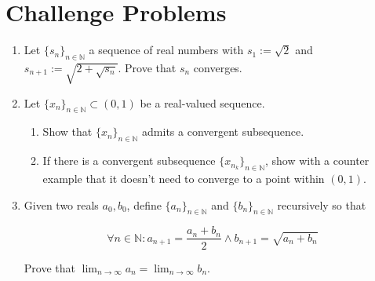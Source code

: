 \documentclass{article}
\theoremstyle{definition}
\begin{document}
\newpage

\section{Challenge Problems}

\begin{enumerate}
    \item Let $\{s_{n}\}_{n \in \mathbb{N}}$ a sequence of real numbers with $s_{1} := \sqrt{2}$ and $s_{n+1} := \sqrt{2 + \sqrt{s_{n}}}$. Prove that $s_{n}$ converges.

    \item
    Let $\{x_{n}\}_{n \in \mathbb{N}} \subset (0,1)$ be a real-valued sequence. 

    \begin{enumerate}
        \item Show that $\{x_{n}\}_{n \in \mathbb{N}}$ admits a convergent subsequence.

        
        
        \item If there is a convergent subsequence $\{x_{n_{k}}\}_{n \in \mathbb{N}}$, show with a counter example that it doesn't need to converge to a point within $(0,1)$.
    \end{enumerate}

    \item Given two reals $a_0, b_0$, define $\{a_{n}\}_{n \in \mathbb{N}}$ and $\{b_{n}\}_{n \in \mathbb{N}}$ recursively so that

    \[ \forall n \in \mathbb{N}: a_{n+1} = \frac{a_{n} + b_{n}}{2} \wedge b_{n+1} = \sqrt{a_{n} + b_{n}}\]

    Prove that $\lim_{n\to\infty} a_{n} = \lim_{n\to\infty} b_{n}$.
\end{enumerate}
\end{document}
